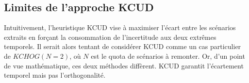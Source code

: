 \documentclass[11pt,a4paper]{article}
\begin{document}
{\small
    \begin{algorithm}[H]
        \caption{Configurable reporting function}
        \label{alg:extract_extreme_path}
        
    \end{algorithm}
}

\subsection{Limites de l'approche KCUD}

Intuitivement, l'heuristique KCUD vise à maximiser l'écart entre les scénarios extraits en forçant la consommation de l'incertitude aux deux extrêmes temporels. Il serait alors tentant de considérer KCUD comme un cas particulier de $KCHOG(N=2)$, où $N$ est le quota de scénarios à remonter. Or, d'un point de vue mathématique, ces deux méthodes diffèrent. KCUD garantit l'écartement temporel mais pas l'orthogonalité.
\end{document}
